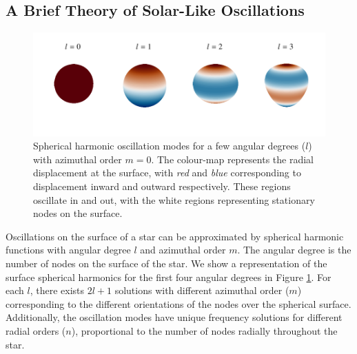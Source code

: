 \subsection{A Brief Theory of Solar-Like Oscillations}\label{sec:seismo-theory}

\begin{figure}[tb]
    \centering
    \includegraphics[trim={0 0.4in 0 0},clip]{figures/spherical_harmonics.pdf}
    \caption[Spherical harmonic oscillation modes for a few angular degrees ($l$) with azimuthal order \(m=0\).]{Spherical harmonic oscillation modes for a few angular degrees ($l$) with azimuthal order \(m=0\). The colour-map represents the radial displacement at the surface, with \emph{red} and \emph{blue} corresponding to displacement inward and outward respectively. These regions oscillate in and out, with the white regions representing stationary nodes on the surface.}
    \label{fig:spherical-harmonics}
\end{figure}

Oscillations on the surface of a star can be approximated by spherical harmonic functions with angular degree \(l\) and azimuthal order \(m\). The angular degree is the number of nodes on the surface of the star. We show a representation of the surface spherical harmonics for the first four angular degrees in Figure \ref{fig:spherical-harmonics}. For each \(l\), there exists \(2l+1\) solutions with different azimuthal order (\(m\)) corresponding to the different orientations of the nodes over the spherical surface. Additionally, the oscillation modes have unique frequency solutions for different radial orders (\(n\)), proportional to the number of nodes radially throughout the star.

